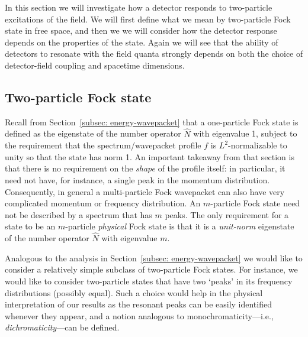 \documentclass[11pt,prd,onecolumn,superscriptaddress,nofootinbib,floatfix,amsmath,amssymb]{revtex4-2}
\begin{document}
    In this section we will investigate how a detector responds to two-particle excitations of the field. We will first define what we mean by two-particle Fock state in free space, and then we we will consider how the detector response depends on the properties of the state. Again we will see that the ability of detectors to resonate with the field quanta strongly depends on both the choice of detector-field coupling and spacetime dimensions.

    
    
    \subsection{Two-particle Fock state}
    \label{subsec: two-particle-state-def}
    

    
    Recall from Section~\ref{subsec: energy-wavepacket} that a one-particle Fock state is defined as the eigenstate of the number operator $\hat N$ with eigenvalue 1, subject to the requirement that the spectrum/wavepacket profile $f$ is $L^2$-normalizable to unity so that the state has norm 1. An important takeaway from that section is that there is no requirement on the \textit{shape} of the profile itself: in particular, it need not have, for instance, a single peak in the momentum distribution. Consequently, in general a multi-particle Fock wavepacket can also have very complicated momentum or frequency distribution. An $m$-particle Fock state need not be described by a spectrum that has $m$ peaks. The only requirement for a state to be an $m$-particle \textit{physical} Fock state is that it is a \textit{unit-norm} eigenstate of the number operator $\hat N$ with eigenvalue $m$. 
    
    Analogous to the analysis in Section~\ref{subsec: energy-wavepacket} we would like to consider a relatively simple subclass of two-particle Fock states. For instance, we would like to consider two-particle states that have two `peaks' in its frequency distributions (possibly equal). Such a choice would help in the physical interpretation of our results as the resonant peaks can be easily identified whenever they appear, and a notion analogous to monochromaticity---i.e., \textit{dichromaticity}---can be defined. %
    
\end{document}
